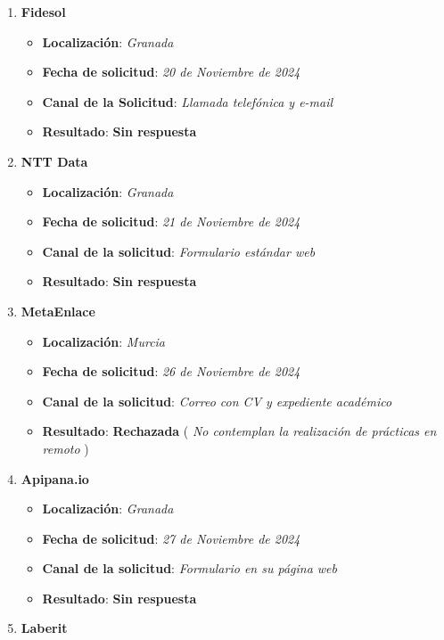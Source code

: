 \begin{enumerate}
	\item {\large \textbf{Fidesol}}
	\begin{itemize}
		\item \textbf{Localización}: \textit{Granada}
		\item \textbf{Fecha de solicitud}: \textit{20 de Noviembre de 2024}
		\item \textbf{Canal de la Solicitud}: \textit{Llamada telefónica y e-mail}
		\item \textbf{Resultado}: {\color{orange} \textbf{Sin respuesta}}
	\end{itemize}
	\item {\large\textbf{NTT Data}}
		\begin{itemize}
		\item \textbf{Localización}: \textit{Granada}
		\item \textbf{Fecha de solicitud}: \textit{21 de Noviembre de 2024}
		\item \textbf{Canal de la solicitud}: \textit{Formulario estándar web}
		\item \textbf{Resultado}: {\color{orange} \textbf{Sin respuesta}}
	\end{itemize}
		\item {\large\textbf{MetaEnlace}}
	\begin{itemize}
		\item \textbf{Localización}: \textit{Murcia}
		\item \textbf{Fecha de solicitud}: \textit{26 de Noviembre de 2024}
		\item \textbf{Canal de la solicitud}: \textit{Correo con CV y expediente académico}
		\item \textbf{Resultado}: {\color{red}\textbf{Rechazada}}  (\textit{ No contemplan la realización de prácticas en remoto} )
	\end{itemize}
		\item \textbf{Apipana.io}
		\begin{itemize}
		\item \textbf{Localización}: \textit{Granada}
		\item \textbf{Fecha de solicitud}: \textit{27 de Noviembre de 2024}
		\item \textbf{Canal de la solicitud}: \textit{Formulario en su página web}
		\item \textbf{Resultado}: {\color{orange} \textbf{Sin respuesta}}
	\end{itemize}
	\item \textbf{Laberit}

\end{enumerate}
